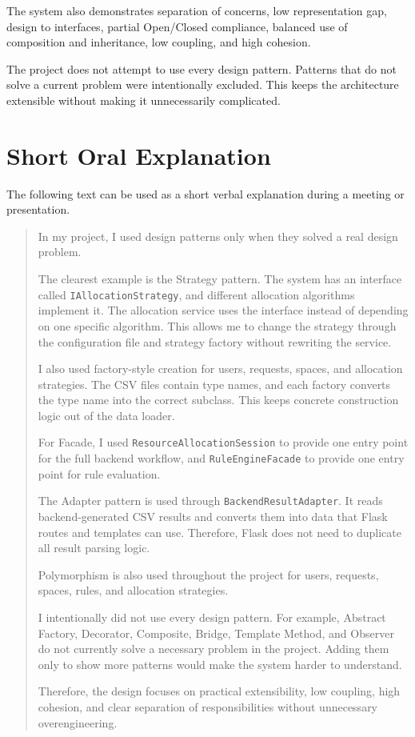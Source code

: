 \documentclass[12pt,a4paper]{article}
\begin{document}
The system also demonstrates separation of concerns, low representation gap,
design to interfaces, partial Open/Closed compliance, balanced use of
composition and inheritance, low coupling, and high cohesion.

The project does not attempt to use every design pattern. Patterns that do not
solve a current problem were intentionally excluded. This keeps the
architecture extensible without making it unnecessarily complicated.

\appendix
\section{Short Oral Explanation}

The following text can be used as a short verbal explanation during a meeting
or presentation.

\begin{quote}
In my project, I used design patterns only when they solved a real design
problem.

The clearest example is the Strategy pattern. The system has an interface
called \texttt{IAllocationStrategy}, and different allocation algorithms
implement it. The allocation service uses the interface instead of depending
on one specific algorithm. This allows me to change the strategy through the
configuration file and strategy factory without rewriting the service.

I also used factory-style creation for users, requests, spaces, and allocation
strategies. The CSV files contain type names, and each factory converts the
type name into the correct subclass. This keeps concrete construction logic
out of the data loader.

For Facade, I used \texttt{ResourceAllocationSession} to provide one entry
point for the full backend workflow, and \texttt{RuleEngineFacade} to provide
one entry point for rule evaluation.

The Adapter pattern is used through \texttt{BackendResultAdapter}. It reads
backend-generated CSV results and converts them into data that Flask routes
and templates can use. Therefore, Flask does not need to duplicate all result
parsing logic.

Polymorphism is also used throughout the project for users, requests, spaces,
rules, and allocation strategies.

I intentionally did not use every design pattern. For example, Abstract
Factory, Decorator, Composite, Bridge, Template Method, and Observer do not
currently solve a necessary problem in the project. Adding them only to show
more patterns would make the system harder to understand.

Therefore, the design focuses on practical extensibility, low coupling, high
cohesion, and clear separation of responsibilities without unnecessary
overengineering.
\end{quote}
\end{document}
